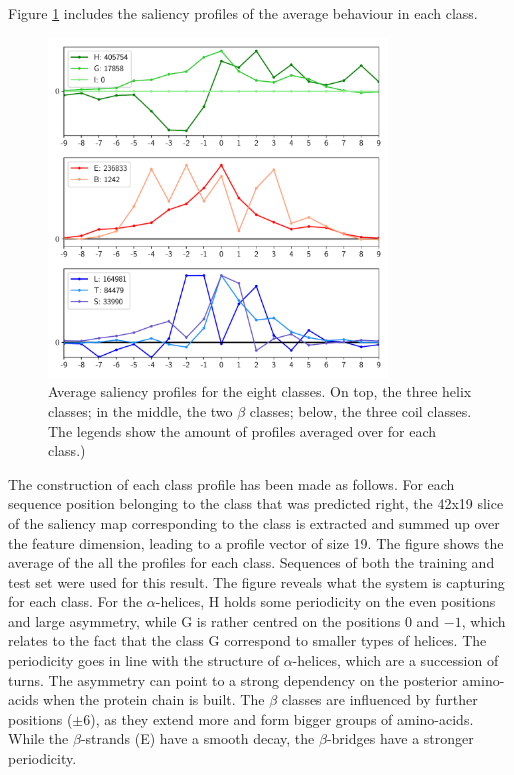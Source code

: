 \documentclass{article}
\begin{document}
Figure \ref{fig:sheereq} includes the saliency profiles of the average behaviour in each class.
\begin{figure}
	\centering
	\centerline{\includegraphics[width=9cm]{sheerabsequal6016_class_aa}}
	\caption{Average saliency profiles for the eight classes. On top, the three helix classes; in the middle, the two $\beta$ classes; below, the three coil classes. The legends show the amount of profiles averaged over for each class.)}
	\label{fig:sheereq}
\end{figure}
The construction of each class profile has been made as follows. For each sequence position belonging to the class that was predicted right, the 42x19 slice of the saliency map corresponding to the class is extracted and summed up over the feature dimension, leading to a profile vector of size 19. The figure shows the average of the all the profiles for each class. Sequences of both the training and test set were used for this result. The figure reveals what the system is capturing for each class. For the $\alpha$-helices, H holds some periodicity on the even positions and large asymmetry, while G is rather centred on the positions $0$ and $-1$, which relates to the fact that the class G correspond to smaller types of helices. The periodicity goes in line with the structure of $\alpha$-helices, which are a succession of turns. The asymmetry can point to a strong dependency on the posterior amino-acids when the protein chain is built. The $\beta$ classes are influenced by further positions ($\pm6$), as they extend more and form bigger groups of amino-acids. While the $\beta$-strands (E) have a smooth decay, the $\beta$-bridges have a stronger periodicity.
\end{document}
